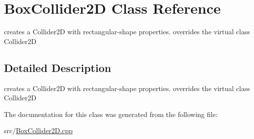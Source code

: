 \hypertarget{class_box_collider2_d}{}\section{Box\+Collider2D Class Reference}
\label{class_box_collider2_d}


creates a Collider2D with rectangular-\/shape properties. overrides the virtual class Collider2D  




\subsection{Detailed Description}
creates a Collider2D with rectangular-\/shape properties. overrides the virtual class Collider2D 

The documentation for this class was generated from the following file\+:\begin{DoxyCompactItemize}
\item 
src/\hyperlink{_box_collider2_d_8cpp}{Box\+Collider2\+D.\+cpp}\end{DoxyCompactItemize}
